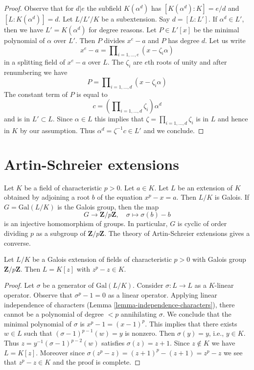 \begin{proof}
Observe that for $d | e$ the subfield $K(\alpha^d)$ has
$[K(\alpha^d) : K] = e/d$ and $[L : K(\alpha^d)] = d$.
Let $L/L'/K$ be a subextension. Say $d = [L : L']$. If $\alpha^d \in L'$,
then we have $L' = K(\alpha^d)$ for degree reasons.
Let $P \in L'[x]$ be the minimal polynomial of $\alpha$ over $L'$.
Then $P$ divides $x^e - a$ and $P$ has degree $d$.
Let us write
$$
x^e - a = \prod\nolimits_{i = 1, \ldots, e} (x - \zeta_i \alpha)
$$
in a splitting field of $x^e - a$ over $L$. The $\zeta_i$ are $e$th roots
of unity and after renumbering we have
$$
P = \prod\nolimits_{i = 1, \ldots, d} (x - \zeta_i \alpha)
$$
The constant term of $P$ is equal to
$$
c = (\prod\nolimits_{i = 1, \ldots, d} \zeta_i) \alpha^d
$$
and is in $L' \subset L$. Since $\alpha \in L$ this implies that
$\zeta = \prod_{i = 1, \ldots, d} \zeta_i$ is in $L$ and hence in $K$ by
our assumption. Thus $\alpha^d = \zeta^{-1}c \in L'$ and we conclude.
\end{proof}




\section{Artin-Schreier extensions}
\label{section-Artin-Schreier}

\noindent
Let $K$ be a field of characteristic $p > 0$. Let $a \in K$. Let $L$ be an
extension of $K$ obtained by adjoining a root $b$ of the equation
$x^p - x = a$. Then $L/K$ is Galois. If $G = \text{Gal}(L/K)$ is the Galois
group, then the map
$$
G \longrightarrow \mathbf{Z}/p\mathbf{Z},\quad
\sigma \longmapsto \sigma(b) - b
$$
is an injective homomorphism of groups. In particular, $G$ is cyclic
of order dividing $p$ as a subgroup of $\mathbf{Z}/p\mathbf{Z}$.
The theory of Artin-Schreier extensions gives a converse.

\begin{lemma}
\label{lemma-Artin-Schreier}
Let $L/K$ be a Galois extension of fields of characteristic $p > 0$
with Galois group $\mathbf{Z}/p\mathbf{Z}$. Then $L = K[z]$ with
$z^p - z \in K$.
\end{lemma}

\begin{proof}
Let $\sigma$ be a generator of $\text{Gal}(L/K)$.
Consider $\sigma : L \to L$ as a $K$-linear operator.
Observe that $\sigma^p - 1 = 0$ as a linear operator.
Applying linear independence of characters
(Lemma \ref{lemma-independence-characters}),
there cannot be a polynomial of degree $< p$
annihilating $\sigma$. We conclude that the minimal
polynomial of $\sigma$ is $x^p - 1 = (x - 1)^p$.
This implies that there exists $w \in L$ such that
$(\sigma - 1)^{p - 1}(w) = y$ is nonzero. Then
$\sigma(y) = y$, i.e., $y \in K$. Thus
$z = y^{-1}(\sigma - 1)^{p - 2}(w)$ satisfies
$\sigma(z) = z + 1$. Since $z \not \in K$ we have $L = K[z]$.
Moreover since $\sigma(z^p - z) = (z + 1)^p - (z + 1) = z^p - z$
we see that $z^p - z \in K$ and the proof is complete.
\end{proof}







